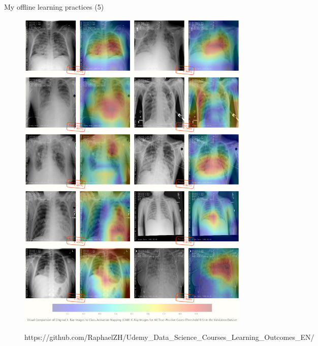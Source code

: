 \documentclass{beamer}
\begin{document}
\begin{frame}[fragile]{My offline learning practices (5)}
\begin{figure}[!htb]
		\endminipage\hfill
		\centering\includegraphics[width=\linewidth]{images/deep_learning_5_2.png}
		\endminipage\hfill
		\vspace{.2em}
		\begin{columns}
			\normalfont\footnotesize{https://github.com/RaphaelZH/Udemy\_Data\_Science\_Courses\_Learning\_Outcomes\_EN/}
		\end{columns}
	\end{figure}
\end{frame}
\end{document}
